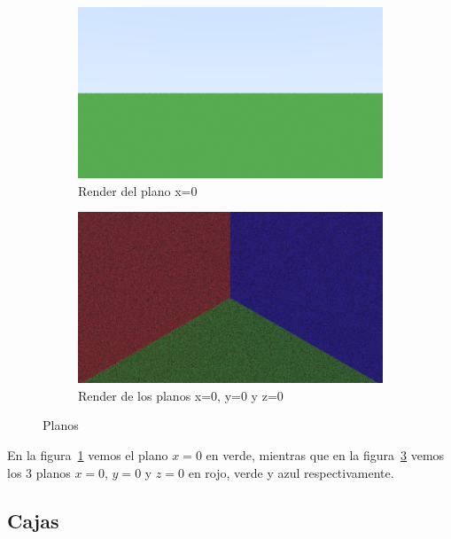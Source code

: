 \begin{figure}[H]
    \centering
    \begin{subfigure}{0.45\linewidth}
        \centering
        \includegraphics[width=\textwidth]{imgs/escena_plano}
        \caption{Render del plano x=0}
        \label{fig:render_plano_x0}
    \end{subfigure}
    \begin{subfigure}{0.45\linewidth}
        \centering
        \includegraphics[width=\textwidth]{imgs/escena_3_planos}
        \caption{Render de los planos x=0, y=0 y z=0}
        \label{fig:render_planos_0}
    \end{subfigure}
    \caption{Planos}
\end{figure}

En la figura~\ref{fig:render_plano_x0} vemos el plano $x=0$ en verde, mientras que en la
figura~\ref{fig:render_planos_0} vemos los 3 planos $x=0$, $y=0$ y $z=0$ en rojo, verde y azul
respectivamente.

\subsection{Cajas} \label{subsec:cajas}

